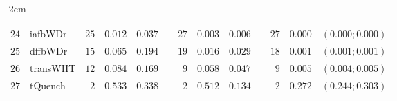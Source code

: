 \begin{table*}[!htbp]
\begin{adjustwidth*}{}{-2cm}
\begin{tabular}{@{}rlrrrrrrrrrcc@{}}
\footnotesize{$24$} & \footnotesize{iafbWDr  } & \footnotesize{$25$} & \footnotesize{$0.012$} & \footnotesize{$0.037$} && \footnotesize{$27$} & \footnotesize{$0.003$} & \footnotesize{$0.006$} && \footnotesize{$27$} & \footnotesize{$0.000$} & \footnotesize{$(0.000;0.000)$} \\
\footnotesize{$25$} & \footnotesize{dffbWDr  } & \footnotesize{$15$} & \footnotesize{$0.065$} & \footnotesize{$0.194$} && \footnotesize{$19$} & \footnotesize{$0.016$} & \footnotesize{$0.029$} && \footnotesize{$18$} & \footnotesize{$0.001$} & \footnotesize{$(0.001;0.001)$} \\
\footnotesize{$26$} & \footnotesize{transWHT } & \footnotesize{$12$} & \footnotesize{$0.084$} & \footnotesize{$0.169$} && \footnotesize{$9 $} & \footnotesize{$0.058$} & \footnotesize{$0.047$} && \footnotesize{$9 $} & \footnotesize{$0.005$} & \footnotesize{$(0.004;0.005)$} \\
\footnotesize{$27$} & \footnotesize{tQuench  } & \footnotesize{$2 $} & \footnotesize{$0.533$} & \footnotesize{$0.338$} && \footnotesize{$2 $} & \footnotesize{$0.512$} & \footnotesize{$0.134$} && \footnotesize{$2 $} & \footnotesize{$0.272$} & \footnotesize{$(0.244;0.303)$} \\
\bottomrule
\end{tabular}
\end{adjustwidth*}
\end{table*}

